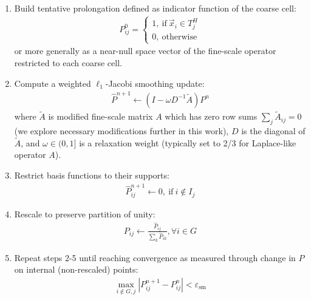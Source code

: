 \begin{enumerate}
    \item Build tentative prolongation defined as indicator function of the coarse cell:
    \begin{align}
        P^0_{ij} =
        \begin{cases}
        1, \:\text{if}\:\vec{x}_i \in T_j^H \\
        0, \:\text{otherwise}
        \end{cases}
    \end{align}
    or more generally as a near-null space vector of the fine-scale operator restricted to each coarse cell.
    \item Compute a weighted $\ell_1$-Jacobi smoothing update:
    \begin{align}
        \widehat{P}^{n+1} \leftarrow (I - \omega D^{-1} \widetilde{A}) P^n \label{eq:msrsb_update}
    \end{align}
    where $\widetilde{A}$ is modified fine-scale matrix $A$ which has zero row sums $\sum_j \widetilde{A}_{ij} = 0$ (we explore necessary modifications further in this work), $D$ is the diagonal of $\widetilde{A}$, and $\omega \in (0,1]$ is a relaxation weight (typically set to 2/3 for Laplace-like operator $A$).  
    \item Restrict basis functions to their supports:
    \begin{align}
        \widehat{P}^{n+1}_{ij} \leftarrow 0, \:\text{if}\: i \notin I_j \label{eq:msrsb_restrict}
    \end{align}
    \item Rescale to preserve partition of unity:
    \begin{align}
        P_{ij} \leftarrow \frac{\widehat{P}_{ij}}{\sum\limits_{k}\widehat{P}_{ik}}, \forall i \in G \label{eq:msrsb_rescale}
    \end{align}
    \item Repeat steps 2-5 until reaching convergence as measured through change in $P$ on internal (non-rescaled) points:
    \begin{align}
        \max\limits_{i \notin G, j}|P^{n+1}_{ij} - P^{n}_{ij}| < \varepsilon_{\text{sm}} \label{eq:msrsb_check}
    \end{align}
\end{enumerate}

